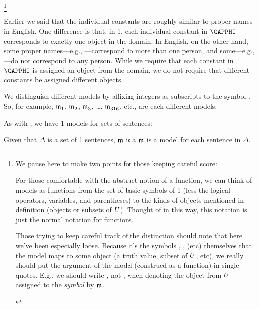 \footnote{%
We pause here to make two points for those keeping careful score:
\begin{enumerate*}[label=(\arabic*)]
\item For those comfortable with the abstract notion of a function, we can think of models as functions from the set of basic symbols of \GQL{}1 (less the logical operators, variables, and parentheses) to the kinds of objects mentioned in definition  (objects or subsets of $U$). 
Thought of in this way, this notation is just the normal notation for functions.
\item\label{pointtwo} Those trying to keep careful track of the  distinction should note that here we've been especially loose. 
Because it's the symbols \mention{$\PP$}, ,  (etc) themselves that the model maps to some object (a truth value, subset of $U$, etc), we really should put the argument of the model (construed as a function) in single quotes. E.g., we should write , not \mention{$\IntA(\PP)$}, when denoting the object from $U$ assigned to the \emph{symbol} \mention{$\PP$} by $\mathfrak{m}$. 
\end{enumerate*}
\label{Int Footnote}
} 


Earlier we said that the individual constants are roughly similar to proper names in English.  One difference is that, in \GQL{}1, each individual constant in $\CAPPHI$ corresponds to exactly one object in the domain.  In English, on the other hand, some proper names---e.g., ---correspond to more than one person, and some---e.g., ---do not correspond to any person.  While we require that each constant in $\CAPPHI$ is assigned an object from the domain, we do not require that different constants be assigned different objects. 

We distinguish different models by affixing integers as subscripts to the symbol \mention{$\As{}{}$}.  So, for example, $\mathfrak{m^{\mathrm{}}_{\mathrm{1}}}$, $\mathfrak{m^{\mathrm{}}_{\mathrm{2}}}$, $\mathfrak{m^{\mathrm{}}_{\mathrm{3}}}$, \ldots, $\mathfrak{m^{\mathrm{}}_{\mathrm{316}}}$, etc., are each different models.

As with \GSL{}, we have \GQL{}1 models for sets of sentences:

\begin{majorILnc}{}
	Given that $\Delta$ is a set of \GQL{}1 sentences, $\mathfrak{m}$ is a  \Iff $\mathfrak{m}$ is a model for each sentence in $\Delta$.
\end{majorILnc}

